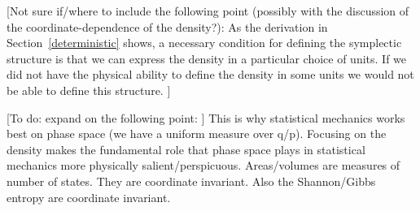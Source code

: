 \documentclass[letterpaper]{article}
\begin{document}
[Not sure if/where to include the following point (possibly with the discussion of the coordinate-dependence of the density?): As the derivation in Section~\ref{deterministic} shows, a necessary condition for defining the symplectic structure is that we can express the density in a particular choice of units. If we did not have the physical ability to define the density in some units we would not be able to define this structure. ]

[To do: expand on the following point: ] This is why statistical mechanics works best on phase space (we have a uniform measure over q/p). Focusing on the density makes the fundamental role that phase space plays in statistical mechanics more physically salient/perspicuous. Areas/volumes are measures of number of states. They are coordinate invariant. Also the Shannon/Gibbs entropy are coordinate invariant. 










\end{document}
